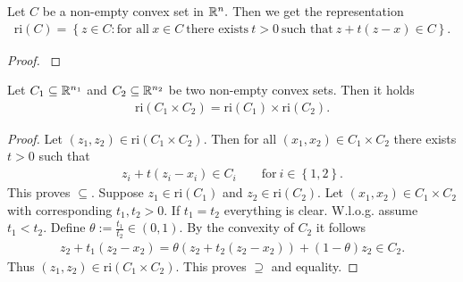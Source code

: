 \begin{definition}
\begin{proposition}
  Let $C$ be a non-empty convex set in $\mathbb{R}^n.$ Then we get the representation
  \begin{gather}
    \mathrm{ri}(C)
    =
    \left\{ 
      z \in C
      \colon
      \text{for all}\ 
      x \in C \ 
      \text{there exists}\ 
      t > 0 \ 
      \text{such that}\ 
      z + t (z-x)
      \in C
    \right\}.
  \end{gather}
\end{proposition}
\begin{proof}
  \cite[Theorem~6.4]{Rockafellar1970}
\end{proof}
\begin{proposition}
  Let $C_1\subseteq \mathbb{R}^{n_1}$ and $C_2\subseteq \mathbb{R}^{n_2}$ be two non-empty convex sets. Then it holds
  \begin{gather}
    \mathrm{ri}(C_1\times C_2)
    = 
    \mathrm{ri}(C_1)
    \times
    \mathrm{ri}(C_2).
  \end{gather}
\end{proposition}
\begin{proof}
  Let
  $
  (z_1, z_2)
  \in 
  \mathrm{ri}(C_1\times C_2).
  $
  Then for all 
  $
  (x_1, x_2)
  \in 
  C_1\times C_2
  $
  there exists
  $t>0$
  such that
  \begin{gather}
      z_i + t (z_i-x_i)
      \in C_i
      \qquad
      \text{for}\ 
      i\in \left\{ 1,2 \right\}.
  \end{gather}
  This proves $\subseteq.$
  Suppose 
  $
    z_1 
    \in
    \mathrm{ri}(C_1)
  $
  and
  $
    z_2 
    \in
    \mathrm{ri}(C_2).
  $
  Let
  $
    (x_1,x_2)\in C_1\times C_2
  $
  with corresponding $t_1,t_2 >0$.
  If $t_1=t_2$ everything is clear.
  W.l.o.g.
  assume 
  $t_1<t_2$. Define $\theta:=\frac{t_1}{t_2}\in (0,1).$
  By the convexity of $C_2$ it follows
  \begin{gather}
    z_2 + t_1 (z_2 - x_2)
    =
    \theta
    (
    z_2 + t_2 (z_2 - x_2)
    )
    +
    (1-\theta)z_2
    \in C_2.
  \end{gather}
  Thus
  $
  (z_1,z_2)\in\mathrm{ri}(C_1\times C_2). 
  $
  This proves $\supseteq$ and equality.
\end{proof}
  

\end{definition}
